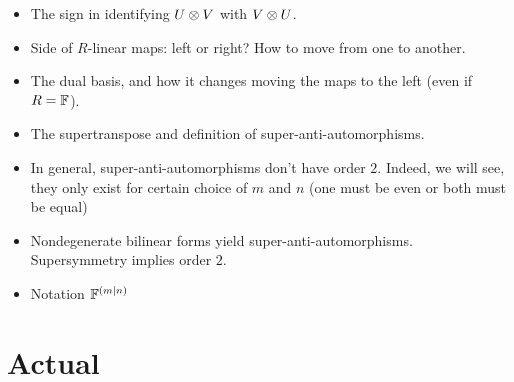 \documentclass{amsbook}
\begin{document}
\begin{itemize}
        \item The sign in identifying $U \otimes V$ with $V \otimes U$.
    
        \item Side of $R$-linear maps: left or right? How to move from one to another.
    
        \item The dual basis, and how it changes moving the maps to the left (even if $R=\mathbb{F}$).
    
        \item The supertranspose and definition of super-anti-automorphisms.
        
        \item In general, super-anti-automorphisms don't have order $2$. Indeed, we will see, they only exist for certain choice of $m$ and $n$ (one must be even or both must be equal)
        
        \item Nondegenerate bilinear forms yield super-anti-automorphisms. Supersymmetry implies order $2$.
        
        \item Notation $\mathbb{F}^{(m|n)}$

\end{itemize}


\section{Actual}
\end{document}
